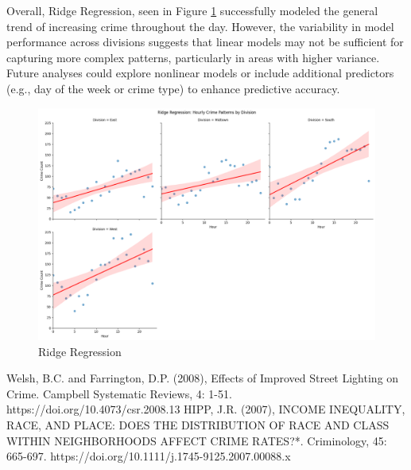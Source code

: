 \documentclass{report}
\begin{document}
Overall, Ridge Regression, seen in Figure \ref{fig:ridge-reg} successfully modeled the general trend of increasing crime throughout the day. However, the variability in model performance across divisions suggests that linear models may not be sufficient for capturing more complex patterns, particularly in areas with higher variance. Future analyses could explore nonlinear models or include additional predictors (e.g., day of the week or crime type) to enhance predictive accuracy.

\begin{figure}[ht]
  \begin{center}
    \advance\leftskip-3cm
    \advance\rightskip-3cm
    \includegraphics[keepaspectratio=true,scale=.5]{ridge-reg}
    \caption{Ridge Regression}
    \label{fig:ridge-reg}
  \end{center}
\end{figure}



\begin{thebibliography}{9}
  Welsh, B.C. and Farrington, D.P. (2008), Effects of Improved Street Lighting on Crime. Campbell Systematic Reviews, 4: 1-51. https://doi.org/10.4073/csr.2008.13
  HIPP, J.R. (2007), INCOME INEQUALITY, RACE, AND PLACE: DOES THE DISTRIBUTION OF RACE AND CLASS WITHIN NEIGHBORHOODS AFFECT CRIME RATES?*. Criminology, 45: 665-697. https://doi.org/10.1111/j.1745-9125.2007.00088.x
\end{thebibliography}
\end{document}
